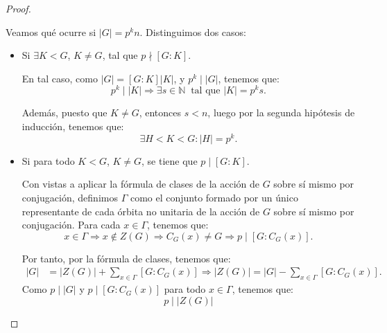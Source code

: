 \begin{ejercicio}
\begin{teo}
\begin{proof}
\begin{itemize}
\begin{itemize}
                    Veamos qué ocurre si $|G|=p^k n$. Distinguimos dos casos:
                    \begin{itemize}
                        \item Si $\exists K<G$, $K\neq G$, tal que \(p\nmid [G:K]\).
                        
                        En tal caso, como $|G|=[G:K]|K|$, y $p^k\mid |G|$, tenemos que:
                        \begin{equation*}
                            p^k\mid |K| \Longrightarrow \exists s\in \mathbb{N}\ \text{ tal que } |K| = p^k s.
                        \end{equation*}

                        Además, puesto que $K\neq G$, entonces $s<n$, luego por la segunda hipótesis de inducción, tenemos que:
                        \begin{equation*}
                            \exists H<K<G: |H| = p^k.
                        \end{equation*}

                        \item Si para todo $K<G$, $K\neq G$, se tiene que $p\mid [G:K]$.
                        
                        Con vistas a aplicar la fórmula de clases de la acción de \(G\) sobre sí mismo por conjugación, definimos $\Gamma$ como el conjunto formado por un único representante de cada órbita no unitaria de la acción de \(G\) sobre sí mismo por conjugación. Para cada $x\in \Gamma$, tenemos que:
                        \begin{equation*}
                            x\in \Gamma \Longrightarrow x\notin Z(G) \Longrightarrow C_G(x) \neq G
                            \Longrightarrow p\mid [G: C_G(x)].
                        \end{equation*}

                        Por tanto, por la fórmula de clases, tenemos que:
                        \begin{align*}
                            |G| &= |Z(G)| + \sum_{x\in \Gamma} [G: C_G(x)]
                            \Longrightarrow |Z(G)| = |G| - \sum_{x\in \Gamma} [G: C_G(x)].
                        \end{align*}
                        Como \(p\mid |G|\) y \(p\mid [G: C_G(x)]\) para todo \(x\in \Gamma\), tenemos que:
                        \begin{equation*}
                            p\mid |Z(G)|
                        \end{equation*}


\end{itemize}
\end{itemize}
\end{itemize}
\end{proof}
\end{teo}
\end{ejercicio}

